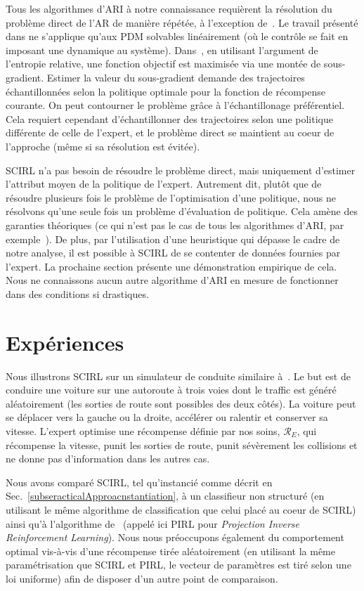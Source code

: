 \documentclass[french,utf8]{./hermes-journal}
\newcommand{\R}{\mathcal{R}}
\begin{document}
Tous les algorithmes d'ARI à notre connaissance requièrent la résolution du problème direct de l'AR de manière répétée, à l'exception de~\cite{Dvi010,boularia011}.
Le travail présenté dans \cite{Dvi010} ne s'applique qu'aux PDM solvables linéairement (où le contrôle se fait en imposant une dynamique au système).
Dans~\cite{boularia011}, en utilisant l'argument de l'entropie relative, une fonction objectif est maximisée via une montée de sous-gradient. Estimer la valeur du sous-gradient demande des trajectoires échantillonnées selon la politique optimale pour la fonction de récompense courante. On peut contourner le problème grâce à l'échantillonage préférentiel. Cela requiert cependant d'échantillonner des trajectoires selon une politique différente de celle de l'expert, et le problème direct se maintient au coeur de l'approche (même si sa résolution est évitée).

SCIRL n'a pas besoin de résoudre le problème direct, mais uniquement d'estimer l'attribut moyen de la politique de l'expert. Autrement dit, plutôt que de résoudre plusieurs fois le problème de l'optimisation d'une politique, nous ne résolvons qu'une seule fois un problème d'évaluation de politique. Cela amène des garanties théoriques (ce qui n'est pas le cas de tous les algorithmes d'ARI, par exemple~\cite{boularia011}). De plus, par l'utilisation d'une heuristique qui dépasse le cadre de notre analyse, il est possible à SCIRL de se contenter de données fournies par l'expert. La prochaine section présente une démonstration empirique de cela. Nous ne connaissons aucun autre algorithme d'ARI en mesure de fonctionner dans des conditions si drastiques.


\section{Expériences}
\label{sexperiments}

Nous illustrons SCIRL sur un simulateur de conduite similaire à~\cite{Abbee004,Sye00ame}.  Le but est de conduire une voiture sur une autoroute à trois voies dont le traffic est généré aléatoirement (les sorties de route sont possibles des deux côtés). La voiture peut se déplacer vers la gauche ou la droite, accélérer ou ralentir et conserver sa vitesse. L'expert optimise une récompense définie par nos soins, $\R_E$, qui récompense la vitesse, punit les sorties de route, punit sévèrement les collisions et ne donne pas d'information dans les autres cas.

Nous avons comparé SCIRL, tel qu'instancié comme décrit en
Sec.~\ref{subseracticalApproacnstantiation}, à un classifieur non structuré (en utilisant le même algorithme de classification que celui placé au coeur de SCIRL) ainsi qu'à l'algorithme de~\cite{Abbee004} (appelé ici PIRL pour \emph{
Projection Inverse Reinforcement Learning}). Nous nous préoccupons également du comportement optimal vis-à-vis d'une récompense tirée aléatoirement (en utilisant la même paramétrisation que SCIRL et PIRL, le vecteur de paramètres est tiré selon une loi uniforme) afin de disposer d'un autre point de comparaison.
\end{document}
